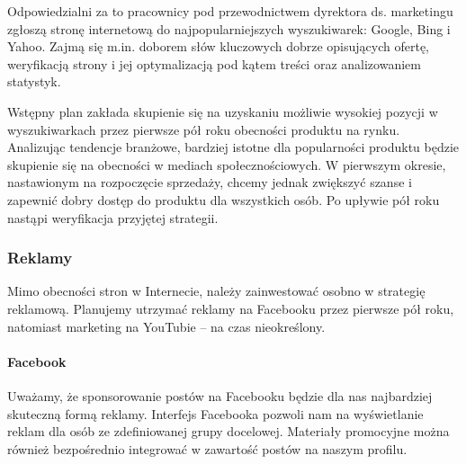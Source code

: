 \documentclass[12pt]{article}
\begin{document}
Odpowiedzialni za to pracownicy pod przewodnictwem dyrektora ds. marketingu zgłoszą stronę internetową do najpopularniejszych wyszukiwarek: Google, Bing i Yahoo.
Zajmą się m.in. doborem słów kluczowych dobrze opisujących ofertę, weryfikacją strony i jej optymalizacją pod kątem treści oraz analizowaniem statystyk.

Wstępny plan zakłada skupienie się na uzyskaniu możliwie wysokiej pozycji w wyszukiwarkach przez pierwsze pół roku obecności produktu na rynku.
Analizując tendencje branżowe, bardziej istotne dla popularności produktu będzie skupienie się na obecności w mediach społecznościowych.
W pierwszym okresie, nastawionym na rozpoczęcie sprzedaży, chcemy jednak zwiększyć szanse i zapewnić dobry dostęp do produktu dla wszystkich osób.
Po upływie pół roku nastąpi weryfikacja przyjętej strategii.


\subsubsection{Reklamy}

Mimo obecności stron w Internecie, należy zainwestować osobno w strategię reklamową.
Planujemy utrzymać reklamy na Facebooku przez pierwsze pół roku, natomiast marketing na YouTubie -- na czas nieokreślony.

\paragraph{Facebook}

Uważamy, że sponsorowanie postów na Facebooku będzie dla nas najbardziej skuteczną formą reklamy.
Interfejs Facebooka pozwoli nam na wyświetlanie reklam dla osób ze zdefiniowanej grupy docelowej.
Materiały promocyjne można również bezpośrednio integrować w zawartość postów na naszym profilu.
\end{document}

